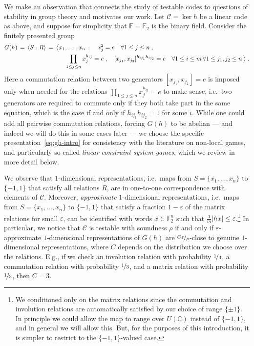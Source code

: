 \documentclass[11pt]{article}
\theoremstyle{definition}
\newcommand{\code}{\mathscr{C}}
\newcommand{\C}{\ensuremath{\mathbb{C}}}
\newcommand{\F}{\ensuremath{\mathbb{F}}}
\newcommand{\eps}{\varepsilon}
\begin{document}
We make an observation that connects the study of testable codes to questions of stability in group theory and motivates our work. Let $\code=\ker h$ be a linear code as above, and suppose for simplicity that $\F=\F_2$ is the binary field. Consider the finitely presented group 
\begin{align}
 G(h) \,=\, \langle S:R\rangle \,=\, \big\langle &x_1,\ldots,x_n \,:\quad  x_j^2=e\quad \forall 1\leq j\leq n\;,\notag\\
& \quad \prod_{1\leq j \leq n} x_j^{h_{ij}} = e\;,\quad [x_{j_1},x_{j_2}]^{h_{ij_1} h_{ij_2}}=e\quad \forall 1\leq i\leq m\,\forall 1\leq j_1,j_2\leq n\,\big\rangle\;.\label{eq:gh-intro}
\end{align}
Here a commutation relation between two generators  $[x_{j_1},x_{j_2}]=e$ is imposed only when needed for the relations $\prod_{1\leq j \leq n} x_j^{h_{ij}} = e$ to make sense, i.e.\ two generators are required to commute only if they both take part in the same equation, which is the case if and only if $h_{ij_1}h_{ij_2}=1$ for some $i$. While one could add all pairwise commutation relations, forcing $G(h)$ to be abelian --- and indeed we will do this in some cases later --- we choose the specific presentation~\eqref{eq:gh-intro} for consistency with the literature on non-local games, and particularly so-called \emph{linear constraint system games}, which we review in more detail below. 

We observe that $1$-dimensional representations, i.e.\ maps from $S=\{x_1,\ldots,x_n\}$ to $\{-1,1\}$ that satisfy all relations $R$, are in one-to-one correspondence with elements of $\code$. Moreover, \emph{approximate} $1$-dimensional representations, i.e.\ maps from  $S=\{x_1,\ldots,x_n\}$ to $\{-1,1\}$ that satisfy a fraction $1-\eps$ of the matrix relations for small $\eps$, can be identified with words $x\in\F_2^n$ such that $\frac{1}{m}|hx|\leq \eps$.\footnote{We conditioned only on the matrix relations since the commutation and involution relations are automatically satisfied by our choice of range $\{\pm1\}$. In principle we could allow the map to range over $U(\C)$ instead of $\{-1,1\}$, and in general we will allow this. But, for the purposes of this introduction, it is simpler to restrict to the $\{-1,1\}$-valued case.} In particular, we notice that $\code$ is testable with soundness $\rho$ if and only if $\eps$-approximate $1$-dimensional representations of $G(h)$ are $\nicefrac{C\eps}{\rho}$-close to genuine $1$-dimensional representations, where $C$ depends on the distribution we choose over the relations. E.g., if we check an involution relation with probability $\nicefrac{1}{3}$, a commutation relation with probability $\nicefrac{1}{3}$, and a matrix relation with probability $\nicefrac{1}{3}$, then $C=3$.
\end{document}
